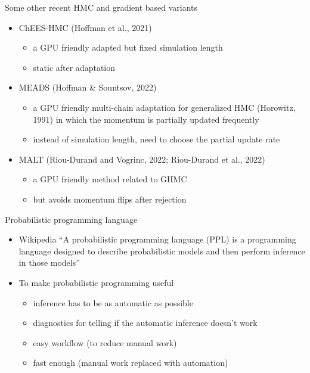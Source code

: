 \documentclass[finnish,english,t]{beamer}
\begin{document}
\begin{frame}{Some other recent HMC and gradient based variants}

  \begin{itemize}
  \item ChEES-HMC (Hoffman et al., 2021)
    \begin{itemize}
    \item a GPU friendly adapted but fixed simulation length
    \item static after adaptation
    \end{itemize}
  \item MEADS (Hoffman \& Sountsov, 2022)
    \begin{itemize}
    \item a GPU friendly multi-chain adaptation for generalized HMC (Horowitz, 1991) in
      which the momentum is partially updated frequently
    \item instead of simulation length, need to choose the partial
      update rate
    \end{itemize}
  \item MALT (Riou-Durand and Vogrinc, 2022; Riou-Durand et al., 2022)
    \begin{itemize}
    \item a GPU friendly method related to GHMC
    \item but avoids momentum flips after rejection
    \end{itemize}
  \end{itemize}
  
\end{frame}

\begin{frame}{Probabilistic programming language}
  
  \begin{itemize}
  \item Wikipedia ``A probabilistic programming language (PPL) is a
    programming language designed to describe probabilistic models
    and then perform inference in those models''
    \pause
  \item To make probabilistic programming useful
    \begin{itemize}
    \item inference has to be as automatic as possible
    \item diagnostics for telling if the automatic inference doesn't work
    \item easy workflow (to reduce manual work)
    \item fast enough (manual work replaced with automation)
    \end{itemize}
  \end{itemize}
\end{frame}
\end{document}
